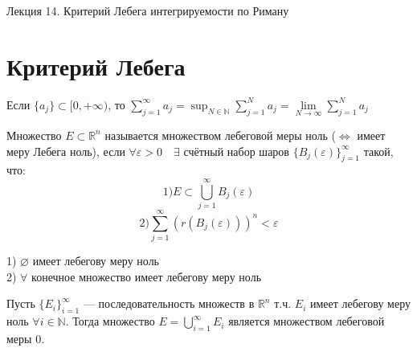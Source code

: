 \documentclass[11pt]{article}
\begin{document}
\begin{titlepage}
    \centering
    \vspace*{\fill}  %

    {\Huge Лекция 14. Критерий Лебега интегрируемости по Риману
    \par}

    \vspace*{\fill}  %
\end{titlepage}

\setcounter{page}{1}

\section{Критерий Лебега}

\begin{definition}
    Если $\{a_j\} \subset [0,+\infty) $, то $\displaystyle \sum_{j=1} ^{\infty} a_j = \sup_{N\in \mathbb{N}} \sum_{j=1} ^{N} a_j=\lim\limits_{N\to \infty} \sum_{j=1} ^ N a_j $  
\end{definition}

\begin{definition}
    Множество $E\subset \mathbb{R}^n$ называется множеством лебеговой меры ноль ($\Leftrightarrow$ имеет меру Лебега ноль), если $\forall \varepsilon>0 \quad \exists$ счётный набор шаров $\{B_j(\varepsilon)\}_{j=1} ^\infty $ такой, что:\\
    \[ 1) E\subset \bigcup_{j=1} ^\infty B_j(\varepsilon) \]
    \[ 2) \sum_{j=1} ^\infty (r(B_j(\varepsilon)))^n < \varepsilon \]

\end{definition}


\begin{example}
    1) $\varnothing$ имеет лебегову меру ноль\\
    2) $\forall$ конечное множество имеет лебегову меру ноль
\end{example}


\begin{lemma}
    Пусть $\{E_i\}_{i=1} ^\infty$ --- последовательность множеств в $\mathbb{R}^n$ т.ч. $E_i$ имеет лебегову меру ноль $\forall i\in \mathbb{N}$. Тогда множество
    $\displaystyle E=\bigcup_{i=1} ^\infty E_i$ является множеством лебеговой меры 0. 
\end{lemma}
\end{document}
